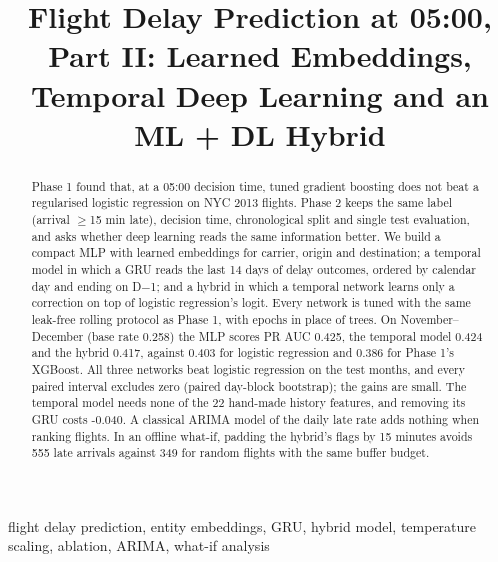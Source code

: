 \documentclass[conference]{IEEEtran}
\begin{document}
\title{Flight Delay Prediction at 05:00, Part II: Learned Embeddings, Temporal Deep Learning and an ML + DL Hybrid}
\author{
}
\maketitle

\begin{abstract}
Phase 1 found that, at a 05:00 decision time, tuned gradient boosting does not beat a regularised logistic regression on NYC 2013 flights. Phase 2 keeps the same label (arrival $\geq$15 min late), decision time, chronological split and single test evaluation, and asks whether deep learning reads the same information better. We build a compact MLP with learned embeddings for carrier, origin and destination; a temporal model in which a GRU reads the last 14 days of delay outcomes, ordered by calendar day and ending on D$-$1; and a hybrid in which a temporal network learns only a correction on top of logistic regression's logit. Every network is tuned with the same leak-free rolling protocol as Phase 1, with epochs in place of trees. On November--December (base rate 0.258) the MLP scores PR AUC 0.425, the temporal model 0.424 and the hybrid 0.417, against 0.403 for logistic regression and 0.386 for Phase 1's XGBoost. All three networks beat logistic regression on the test months, and every paired interval excludes zero (paired day-block bootstrap); the gains are small. The temporal model needs none of the 22 hand-made history features, and removing its GRU costs -0.040. A classical ARIMA model of the daily late rate adds nothing when ranking flights. In an offline what-if, padding the hybrid's flags by 15 minutes avoids 555 late arrivals against 349 for random flights with the same buffer budget.
\end{abstract}

\begin{IEEEkeywords}
flight delay prediction, entity embeddings, GRU, hybrid model, temperature scaling, ablation, ARIMA, what-if analysis
\end{IEEEkeywords}
\end{document}
